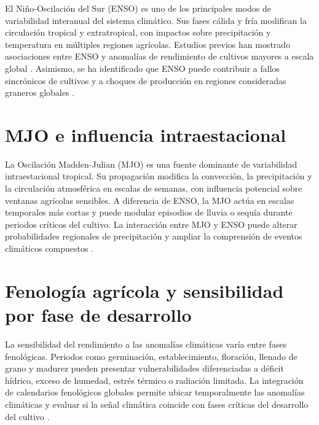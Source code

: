 El Niño-Oscilación del Sur (ENSO) es uno de los principales modos de variabilidad interanual del sistema climático. Sus fases cálida y fría modifican la circulación tropical y extratropical, con impactos sobre precipitación y temperatura en múltiples regiones agrícolas. Estudios previos han mostrado asociaciones entre ENSO y anomalías de rendimiento de cultivos mayores a escala global \parencite{iizumi2014enso}. Asimismo, se ha identificado que ENSO puede contribuir a fallos sincrónicos de cultivos y a choques de producción en regiones consideradas graneros globales \parencite{anderson2019synchronous,anderson2023breadbasket}.


\section{MJO e influencia intraestacional}

La Oscilación Madden-Julian (MJO) es una fuente dominante de variabilidad intraestacional tropical. Su propagación modifica la convección, la precipitación y la circulación atmosférica en escalas de semanas, con influencia potencial sobre ventanas agrícolas sensibles. A diferencia de ENSO, la MJO actúa en escalas temporales más cortas y puede modular episodios de lluvia o sequía durante periodos críticos del cultivo. La interacción entre MJO y ENSO puede alterar probabilidades regionales de precipitación y ampliar la comprensión de eventos climáticos compuestos \parencite{cowan2023combined}.


\section{Fenología agrícola y sensibilidad por fase de desarrollo}

La sensibilidad del rendimiento a las anomalías climáticas varía entre fases fenológicas. Periodos como germinación, establecimiento, floración, llenado de grano y madurez pueden presentar vulnerabilidades diferenciadas a déficit hídrico, exceso de humedad, estrés térmico o radiación limitada. La integración de calendarios fenológicos globales permite ubicar temporalmente las anomalías climáticas y evaluar si la señal climática coincide con fases críticas del desarrollo del cultivo \parencite{franch2022cropcalendars,dimou2018asap}.

